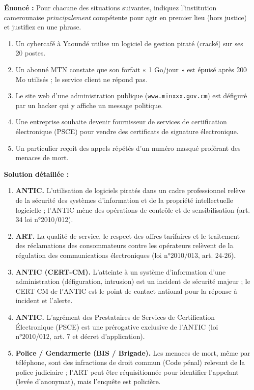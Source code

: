 \documentclass[11pt]{article}
\begin{document}
\begin{exoresolu}
\textbf{Énoncé :} Pour chacune des situations suivantes, indiquez l'institution camerounaise \emph{principalement} compétente pour agir en premier lieu (hors justice) et justifiez en une phrase.

\begin{enumerate}
    \item Un cybercafé à Yaoundé utilise un logiciel de gestion piraté (cracké) sur ses 20 postes.
    \item Un abonné MTN constate que son forfait « 1 Go/jour » est épuisé après 200 Mo utilisés ; le service client ne répond pas.
    \item Le site web d'une administration publique (\texttt{www.minxxx.gov.cm}) est défiguré par un hacker qui y affiche un message politique.
    \item Une entreprise souhaite devenir fournisseur de services de certification électronique (PSCE) pour vendre des certificats de signature électronique.
    \item Un particulier reçoit des appels répétés d'un numéro masqué proférant des menaces de mort.
\end{enumerate}

\textbf{Solution détaillée :}
\begin{enumerate}
    \item \textbf{ANTIC.} L'utilisation de logiciels piratés dans un cadre professionnel relève de la sécurité des systèmes d'information et de la propriété intellectuelle logicielle ; l'ANTIC mène des opérations de contrôle et de sensibilisation (art. 34 loi n°2010/012).
    \item \textbf{ART.} La qualité de service, le respect des offres tarifaires et le traitement des réclamations des consommateurs contre les opérateurs relèvent de la régulation des communications électroniques (loi n°2010/013, art. 24-26).
    \item \textbf{ANTIC (CERT-CM).} L'atteinte à un système d'information d'une administration (défiguration, intrusion) est un incident de sécurité majeur ; le CERT-CM de l'ANTIC est le point de contact national pour la réponse à incident et l'alerte.
    \item \textbf{ANTIC.} L'agrément des Prestataires de Services de Certification Électronique (PSCE) est une prérogative exclusive de l'ANTIC (loi n°2010/012, art. 7 et décret d'application).
    \item \textbf{Police / Gendarmerie (BIS / Brigade).} Les menaces de mort, même par téléphone, sont des infractions de droit commun (Code pénal) relevant de la police judiciaire ; l'ART peut être réquisitionnée pour identifier l'appelant (levée d'anonymat), mais l'enquête est policière.
\end{enumerate}
\end{exoresolu}
\end{document}
